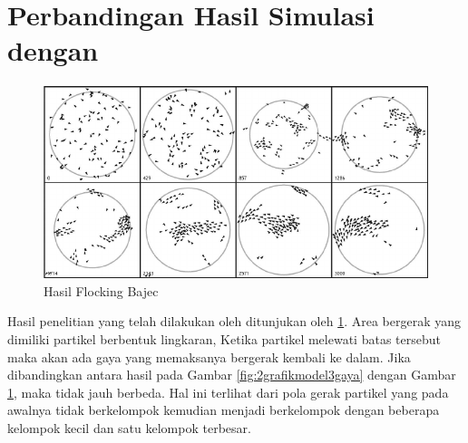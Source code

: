 \section{Perbandingan Hasil Simulasi dengan \citep{Bajec2007}}%
\begin{figure}
\centering
\includegraphics[scale=0.4]{gambar/Bajec.PNG}
\caption{Hasil Flocking Bajec}
\label{fig:bajec1}
\end{figure}
\hspace{0.6cm}Hasil penelitian yang telah dilakukan oleh \citep{Bajec2007} ditunjukan oleh \ref{fig:bajec1}. Area bergerak yang dimiliki partikel berbentuk lingkaran, Ketika partikel melewati batas tersebut maka akan ada gaya yang memaksanya bergerak kembali ke dalam. Jika dibandingkan antara hasil pada Gambar \ref{fig:2grafikmodel3gaya}  dengan Gambar \ref{fig:bajec1}, maka tidak jauh berbeda. Hal ini terlihat dari pola gerak partikel yang pada awalnya tidak berkelompok kemudian menjadi berkelompok dengan beberapa kelompok kecil dan satu kelompok terbesar. 


%
%